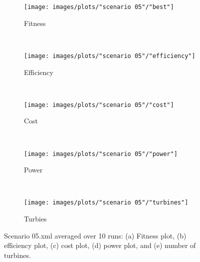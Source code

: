 \begin{figure}[h!]
    \centering
      \begin{subfigure}[b]{0.31\textwidth}
        \texttt{[image: images/plots/"scenario 05"/"best"]}
        \caption{Fitness}
        \hfill
        \label{plot:master slave model fitness plot scenario 00}
    \end{subfigure}
    ~
      \begin{subfigure}[b]{0.31\textwidth}
        \texttt{[image: images/plots/"scenario 05"/"efficiency"]}
        \caption{Efficiency}
        \hfill
        \label{plot:single point crossover}
    \end{subfigure}
    ~
    \begin{subfigure}[b]{0.31\textwidth}
        \texttt{[image: images/plots/"scenario 05"/"cost"]}
        \caption{Cost}
        \hfill
        \label{plot:single point crossover}
    \end{subfigure}
    ~
    \begin{subfigure}[b]{0.31\textwidth}
        \texttt{[image: images/plots/"scenario 05"/"power"]}
        \caption{Power}
        \hfill
        \label{plot:two point crossover}
    \end{subfigure}
    ~
    \begin{subfigure}[b]{0.31\textwidth}
        \texttt{[image: images/plots/"scenario 05"/"turbines"]}
        \caption{Turbies}
        \hfill
        \label{plot:uniform crossover}
    \end{subfigure}
    \caption{Scenario 05.xml averaged over 10 runs: (a) Fitness plot, (b) efficiency plot, (c) cost plot, (d) power plot, and (e) number of turbines.}
    \label{plot:master slave scenario 05}
\end{figure}


